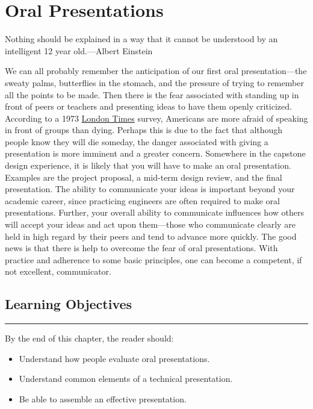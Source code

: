 \chapter{Oral Presentations}
\graphicspath{ {./chapter12/Fig} }

\begin{itquote}
Nothing should be explained in a way that it cannot be understood by an
intelligent 12 year old.---Albert Einstein
\end{itquote}

We can all probably remember the anticipation of our first oral
presentation---the sweaty palms, butterflies in the stomach, and the
pressure of trying to remember all the points to be made. Then there is
the fear associated with standing up in front of peers or teachers and
presenting ideas to have them openly criticized. According to a 1973
\ul{London Times} survey, Americans are more afraid of speaking in front
of groups than dying. Perhaps this is due to the fact that although
people know they will die someday, the danger associated with giving a
presentation is more imminent and a greater concern. Somewhere in the
capstone design experience, it is likely that you will have to make an
oral presentation. Examples are the project proposal, a mid-term design
review, and the final presentation. The ability to communicate your
ideas is important beyond your academic career, since practicing
engineers are often required to make oral presentations. Further, your
overall ability to communicate influences how others will accept your
ideas and act upon them---those who communicate clearly are held in high
regard by their peers and tend to advance more quickly. The good news is
that there is help to overcome the fear of oral presentations. With
practice and adherence to some basic principles, one can become a
competent, if not excellent, communicator.

\section*{Learning Objectives}
\noindent\rule{\linewidth}{1pt}
By the end of this chapter, the reader should:

\begin{itemize}
\item
  Understand how people evaluate oral presentations.
\item
  Understand common elements of a technical presentation.
\item
  Be able to assemble an effective presentation.
\end{itemize}

